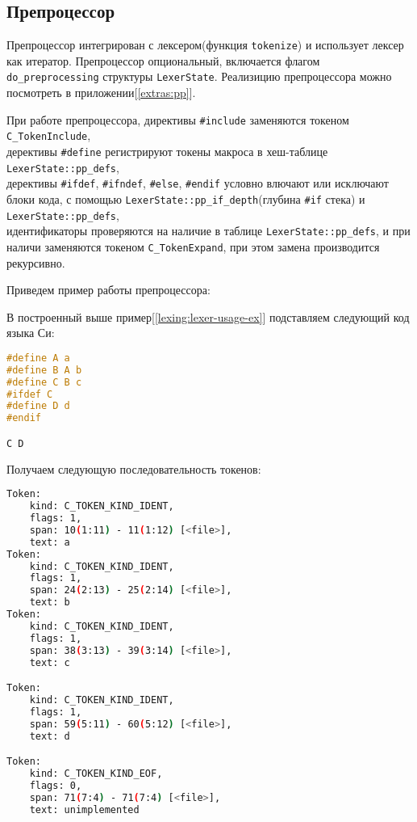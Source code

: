 \clearpage
\subsection{Препроцессор}
\label{pass:pp}

Препроцессор интегрирован с лексером(функция \verb|tokenize|) и использует лексер как итератор.
Препроцессор опциональный, включается флагом \verb|do_preprocessing| структуры \verb|LexerState|.
Реализицию препроцессора можно посмотреть в приложении[\ref{extras:pp}].

При работе препроцессора, директивы \verb|#include| заменяются токеном \verb|C_TokenInclude|, \\
дерективы \verb|#define| регистрируют токены макроса в хеш-таблице \verb|LexerState::pp_defs|, \\
дерективы \verb|#ifdef|, \verb|#ifndef|, \verb|#else|, \verb|#endif| условно влючают или исключают блоки кода, 
с помощью \verb|LexerState::pp_if_depth|(глубина \verb|#if| стека) и \verb|LexerState::pp_defs|, \\
идентификаторы проверяются на наличие в таблице \verb|LexerState::pp_defs|, и при наличи заменяются токеном \verb|C_TokenExpand|,
при этом замена производится рекурсивно.

Приведем пример работы препроцессора:

В построенный выше пример[\ref{lexing:lexer-usage-ex}] подставляем следующий код языка Си:
\begin{lstlisting}[language=c, caption={Входные данные примера}, label={lexing:pp:ex-out}]
#define A a
#define B A b
#define C B c
#ifdef C
#define D d
#endif

C D
\end{lstlisting}

Получаем следующую последовательность токенов:
\begin{lstlisting}[language=bash, caption={Выходные данные примера}, label={lexing:pp:ex-out}]
Token:
    kind: C_TOKEN_KIND_IDENT,
    flags: 1,
    span: 10(1:11) - 11(1:12) [<file>],
    text: a
Token:
    kind: C_TOKEN_KIND_IDENT,
    flags: 1,
    span: 24(2:13) - 25(2:14) [<file>],
    text: b
Token:
    kind: C_TOKEN_KIND_IDENT,
    flags: 1,
    span: 38(3:13) - 39(3:14) [<file>],
    text: c

Token:
    kind: C_TOKEN_KIND_IDENT,
    flags: 1,
    span: 59(5:11) - 60(5:12) [<file>],
    text: d

Token:
    kind: C_TOKEN_KIND_EOF,
    flags: 0,
    span: 71(7:4) - 71(7:4) [<file>],
    text: unimplemented
\end{lstlisting}

